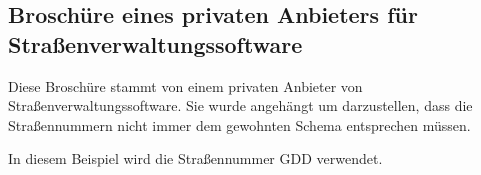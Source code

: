 \documentclass[12pt, a4paper, ngerman]{article}
\begin{document}
\subsection{Broschüre eines privaten Anbieters für Straßenverwaltungssoftware \label{bundGDD}}
Diese Broschüre stammt von einem privaten Anbieter von Straßenverwaltungssoftware. Sie wurde angehängt um darzustellen, dass die Straßennummern nicht immer dem gewohnten Schema entsprechen müssen.

In diesem Beispiel wird die Straßennummer GDD verwendet.

\end{document}
